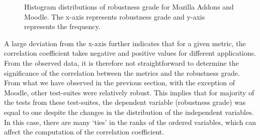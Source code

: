 \begin{figure}[htb!] 
\centering     %
{}
  \captionsetup{justification=justified,
singlelinecheck=false}
\caption{Histogram distributions of robustness grade for Mozilla Addons and Moodle. The x-axis represents robustness grade and y-axis represents the frequency.}
\label{fig:hist}
\end{figure} 

A large deviation from the x-axis further indicates that for a given metric, the correlation coefficient takes negative and positive values for different applications. From the observed data, it is therefore not straightforward to determine the significance of the correlation between the metrics and the robustness grade. From what we have observed in the previous section, with the exception of Moodle, other test-suites were relatively robust. This implies that for majority of the tests from these test-suites, the dependent variable (robustness grade) was equal to one despite the changes in the distribution of the independent variables. In this case, there are many `ties' in the ranks of the ordered variables, which can affect the computation of the correlation coefficient. 


